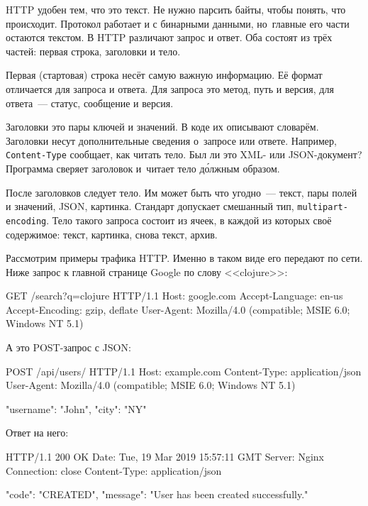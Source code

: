 HTTP удобен тем, что это текст. Не нужно парсить байты, чтобы понять, что
происходит. Протокол работает и с бинарными данными, но~главные его части
остаются текстом. В HTTP различают запрос и ответ. Оба состоят из трёх частей:
первая строка, заголовки и тело.

Первая (стартовая) строка несёт самую важную информацию. Её формат отличается
для запроса и ответа. Для запроса это метод, путь и версия, для ответа~---
статус, сообщение и версия.


Заголовки это пары ключей и значений. В коде их описывают словарём. Заголовки
несут дополнительные сведения о~запросе или ответе. Например,
\verb|Content-Type| сообщает, как читать тело. Был ли это XML- или
JSON-документ? Программа сверяет заголовок и~читает тело д\'{о}лжным образом.


После заголовков следует тело. Им может быть что угодно~--- текст, пары полей и
значений, JSON, картинка. Стандарт допускает смешанный тип,
\verb|multipart-encoding|. Тело такого запроса состоит из ячеек, в каждой из
которых своё содержимое: текст, картинка, снова текст, архив.

Рассмотрим примеры трафика HTTP. Именно в таком виде его передают по сети. Ниже
запрос к главной странице Google по слову <<clojure>>:

\begin{english}
  \begin{http}
GET /search?q=clojure HTTP/1.1
Host: google.com
Accept-Language: en-us
Accept-Encoding: gzip, deflate
User-Agent: Mozilla/4.0 (compatible; MSIE 6.0; Windows NT 5.1)
  \end{http}
\end{english}

\noindent
А это POST-запрос с JSON:

\begin{english}
  \begin{http}
POST /api/users/ HTTP/1.1
Host: example.com
Content-Type: application/json
User-Agent: Mozilla/4.0 (compatible; MSIE 6.0; Windows NT 5.1)

{
  "username": "John",
  "city": "NY"
}
  \end{http}
\end{english}

\noindent
Ответ на него:

\begin{english}
  \begin{http}
HTTP/1.1 200 OK
Date: Tue, 19 Mar 2019 15:57:11 GMT
Server: Nginx
Connection: close
Content-Type: application/json

{
  "code": "CREATED",
  "message": "User has been created successfully."
}
  \end{http}
\end{english}

